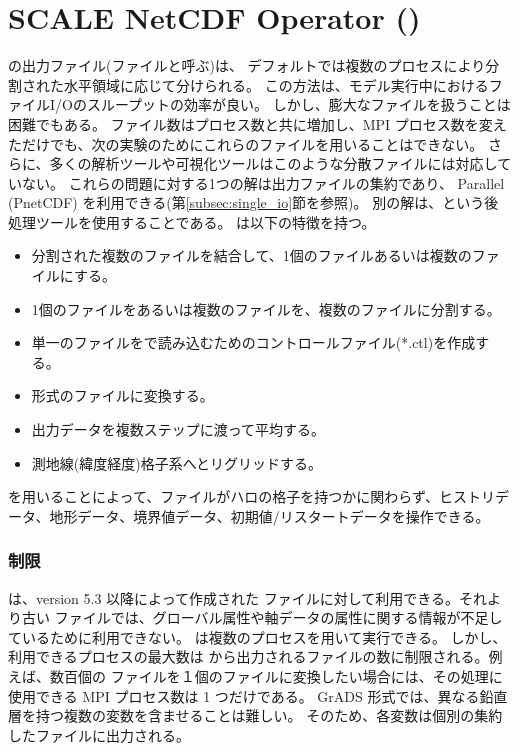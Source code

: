 \section{SCALE NetCDF Operator (\sno)} \label{sec:snoutil}

\scalerm の出力ファイル(\scalenetcdf ファイルと呼ぶ)は、
デフォルトでは複数のプロセスにより分割された水平領域に応じて分けられる。
この方法は、モデル実行中におけるファイルI/Oのスループットの効率が良い。
しかし、膨大なファイルを扱うことは困難でもある。
ファイル数はプロセス数と共に増加し、MPI プロセス数を変えただけでも、次の実験のためにこれらのファイルを用いることはできない。
さらに、多くの解析ツールや可視化ツールはこのような分散ファイルには対応していない。
これらの問題に対する1つの解は出力ファイルの集約であり、
Parallel \netcdf (PnetCDF) を利用できる(第\ref{subsec:single_io}節を参照)。
別の解は、\sno という後処理ツールを使用することである。
\sno は以下の特徴を持つ。

\begin{itemize}
 \item 分割された複数のファイルを結合して、1個のファイルあるいは複数のファイルにする。
 \item 1個のファイルをあるいは複数のファイルを、複数のファイルに分割する。
 \item 単一の{\Netcdf}ファイルを{\grads}で読み込むためのコントロールファイル(*.ctl)を作成する。
 \item \grads 形式のファイルに変換する。
 \item 出力データを複数ステップに渡って平均する。
 \item 測地線(緯度経度)格子系へとリグリッドする。
\end{itemize}

\sno を用いることによって、ファイルがハロの格子を持つかに関わらず、ヒストリデータ、地形データ、境界値データ、初期値/リスタートデータを操作できる。

\subsubsection{制限}

\sno は、\scalelib version 5.3 以降によって作成された \scalenetcdf ファイルに対して利用できる。それより古い \scalenetcdf ファイルでは、グローバル属性や軸データの属性に関する情報が不足しているために利用できない。
\sno は複数のプロセスを用いて実行できる。
しかし、利用できるプロセスの最大数は \sno から出力されるファイルの数に制限される。例えば、数百個の \scalenetcdf ファイルを１個のファイルに変換したい場合には、その処理に使用できる MPI プロセス数は 1 つだけである。
GrADS 形式では、異なる鉛直層を持つ複数の変数を含ませることは難しい。
そのため、各変数は個別の集約したファイルに出力される。

